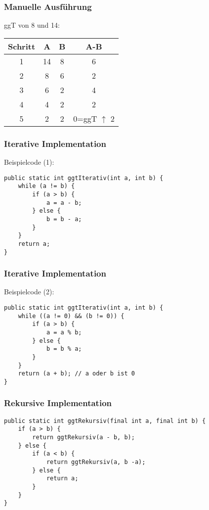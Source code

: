 \documentclass[10pt,a4paper]{article}
\begin{document}
\subsubsection{Manuelle Ausführung}
ggT von 8 und 14:\\
\begin{tabular}{|c|c|c|c|}
    \hline
        Schritt&A&B&A-B\\
        \hline
        1&14&8&6\\
        2&8&6&2\\
        3&6&2&4\\
        4&4&2&\cellcolor{background}2\\
        5&2&2&0=ggT $\uparrow$ 2\\
    \hline
\end{tabular}

\subsubsection{Iterative Implementation}
Beispielcode (1):\\
\lstset{language=Java}
\begin{lstlisting}
public static int ggtIterativ(int a, int b) {
    while (a != b) {
        if (a > b) {
            a = a - b;
        } else {
            b = b - a;
        }
    }
    return a;
}
\end{lstlisting}

\subsubsection{Iterative Implementation}
Beispielcode (2):\\
\lstset{language=Java}
\begin{lstlisting}
public static int ggtIterativ(int a, int b) {
    while ((a != 0) && (b != 0)) {
        if (a > b) {
            a = a % b;
        } else {
            b = b % a;
        }
    }
    return (a + b); // a oder b ist 0
}
\end{lstlisting}

\subsubsection{Rekursive Implementation}
\lstset{language=Java}
\begin{lstlisting}
public static int ggtRekursiv(final int a, final int b) {
    if (a > b) {
        return ggtRekursiv(a - b, b);
    } else {
        if (a < b) {
            return ggtRekursiv(a, b -a);
        } else {
            return a;
        }
    }
}
\end{lstlisting}
\end{document}

